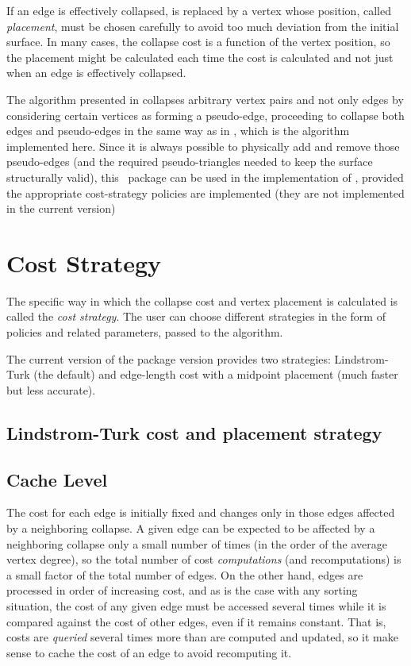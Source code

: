 If an edge is effectively collapsed, is replaced by a vertex whose position, called 
{\em placement}, must be chosen carefully to avoid too much deviation from the initial 
surface. In many cases, the collapse cost is a function of the vertex position, so the 
placement might be calculated each time the cost is calculated and not just when an 
edge is effectively collapsed.

The algorithm presented in \cite{gh-ssqem-97} collapses arbitrary vertex pairs and not 
only edges by considering certain vertices as forming a pseudo-edge, proceeding to collapse
both edges and pseudo-edges in the same way as in \cite{cgal:lt-fmeps-98,cgal:lt-ems-99}, 
which is the algorithm implemented here. Since it is always possible to physically add and 
remove those pseudo-edges (and the required pseudo-triangles needed to keep the surface 
structurally valid), this \cgal\ package can be used in the implementation of 
\cite{gh-ssqem-97}, provided the appropriate cost-strategy policies are implemented 
(they are not implemented in the current version)

\section{Cost Strategy}

The specific way in which the collapse cost and vertex placement is
calculated is called the {\em cost strategy}. The user can choose 
different strategies in the form of policies and related parameters,
passed to the algorithm.
 
The current version of the package version provides two strategies: 
Lindstrom-Turk (the default) and edge-length cost with a midpoint placement 
(much faster but less accurate).

\subsection{Lindstrom-Turk cost and placement strategy\label{SurfaceMeshSimplification:LindstromTurkStrategy}}

\subsection{Cache Level}

The cost for each edge is initially fixed and changes only in those edges 
affected by a neighboring collapse. A given edge can be expected to be 
affected by a neighboring collapse only a small number of times 
(in the order of the average vertex degree), so the total number of 
cost {\em computations} (and recomputations) is a small factor of
the total number of edges. 
On the other hand, edges are processed in order of increasing cost, and as is 
the case with any sorting situation, the cost of any given edge must be accessed 
several times while it is compared against the cost of other edges, even if it 
remains constant. That is, costs are {\em queried} several times more than are computed 
and updated, so it make sense to cache the cost of an edge to avoid recomputing it.

